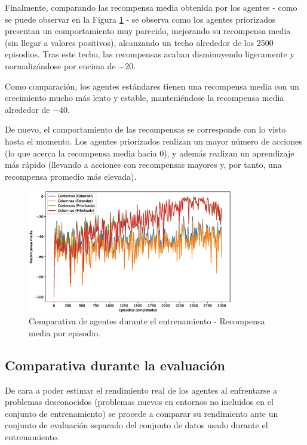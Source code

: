 Finalmente, comparando las recompensa media obtenida por los agentes - como se puede observar en la Figura \ref{fig:chap6-comparison-rewards} - se observa como los agentes priorizados presentan un comportamiento muy parecido, mejorando su recompensa media (sin llegar a valores positivos), alcanzando un techo alrededor de los 2500 episodios. Tras este techo, las recompensas acaban disminuyendo ligeramente y normalizándose por encima de $-20$.

Como comparación, los agentes estándares tienen una recompensa media con un crecimiento mucho más lento y estable, manteniéndose la recompensa media alrededor de $-40$.

De nuevo, el comportamiento de las recompensas se corresponde con lo visto hasta el momento. Los agentes priorizados realizan un mayor número de acciones (lo que acerca la recompensa media hacia $0$), y además realizan un aprendizaje más rápido (llevando a acciones con recompensas mayores y, por tanto, una recompensa promedio más elevada).

\begin{figure}[h]
    \centering
    \includegraphics[width=0.8\textwidth]{imagenes/cap6/comparison/smoothed_rewards.eps}
    \caption{Comparativa de agentes durante el entrenamiento - Recompensa media por episodio.}
    \label{fig:chap6-comparison-rewards}
\end{figure}

\subsection{Comparativa durante la evaluación}

De cara a poder estimar el rendimiento real de los agentes al enfrentarse a problemas desconocidos (problemas nuevos en entornos no incluidos en el conjunto de entrenamiento) se procede a comparar su rendimiento ante un conjunto de evaluación separado del conjunto de datos usado durante el entrenamiento.

